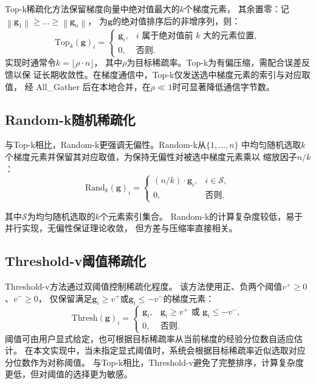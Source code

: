 Top-k稀疏化方法保留梯度向量中绝对值最大的$k$个梯度元素，
其余置零\cite{stich2018sparsified}：记$\left\|\mathbf{g}_1\right\|\geq \ldots \geq \left\|\mathbf{g}_n\right\|$，
为$\mathbf{g}$的绝对值排序后的非增序列，则：
\begin{equation}
\text{Top}_k(\mathbf{g})_i = \begin{cases}
\mathbf{g}_i, & i \text{~属于绝对值前~} k \text{~大的元素位置}, \\
0, & \text{否则}.
\end{cases}
\label{eq:topk}
\end{equation}
实现时通常令$k = \lfloor \rho \cdot n \rfloor$，
其中$\rho$为目标稀疏率。Top-k为有偏压缩，需配合误差反馈以保
证长期收敛性。在梯度通信中，Top-k仅发送选中梯度元素的索引与对应取值，
经 All\_Gather 后在本地合并，在$\rho \ll 1$时可显著降低通信字节数。

\subsection{Random-k随机稀疏化}

与Top-k相比，Random-k更强调无偏性。Random-k从$\{1, \ldots, n\}$
中均匀随机选取$k$个梯度元素并保留其对应取值，为保持无偏性对被选中梯度元素乘以
缩放因子$n/k$：
\begin{equation}
\text{Rand}_k(\mathbf{g})_i = \begin{cases}
(n/k) \cdot \mathbf{g}_i, & i \in \mathcal{S}, \\
0, & \text{否则},
\end{cases}
\label{eq:randomk}
\end{equation}

其中$\mathcal{S}$为均匀随机选取的$k$个元素索引集合。
Random-k的计算复杂度较低，易于并行实现，无偏性保证理论收敛，
但方差与压缩率直接相关。

\subsection{Threshold-v阈值稀疏化}

Threshold-v方法通过双阈值控制稀疏化程度\cite{dutta2020threshold}。
该方法使用正、负两个阈值$v^+ \ge 0$、$v^- \ge 0$，
仅保留满足$\mathbf{g}_i \ge v^+$或$\mathbf{g}_i \le -v^-$的梯度元素：
\begin{equation}
\text{Thresh}(\mathbf{g})_i = \begin{cases}
\mathbf{g}_i, & \mathbf{g}_i \ge v^+ \text{~或~} \mathbf{g}_i \le -v^-, \\
0, & \text{否则}.
\end{cases}
\label{eq:thresholdv}
\end{equation}
阈值可由用户显式给定，也可根据目标稀疏率从当前梯度的经验分位数自适应估计。
在本文实现中，当未指定显式阈值时，系统会根据目标稀疏率近似选取对应分位数作为对称阈值。
与Top-k相比，Threshold-v避免了完整排序，计算复杂度更低，但对阈值的选择更为敏感。

